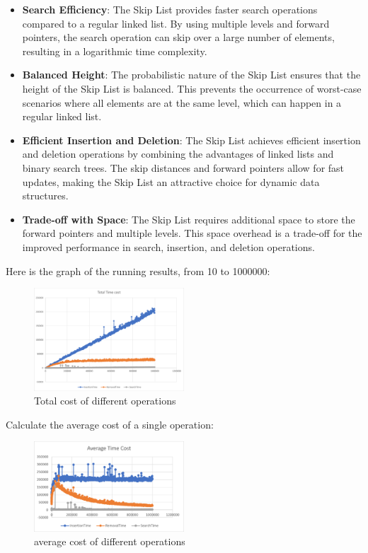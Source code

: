 \documentclass[12pt]{article}
\begin{document}
\begin{itemize}
  \item \textbf{Search Efficiency}: The Skip List provides faster search operations compared to a regular linked list. By using multiple levels and forward pointers, the search operation can skip over a large number of elements, resulting in a logarithmic time complexity.

  \item \textbf{Balanced Height}: The probabilistic nature of the Skip List ensures that the height of the Skip List is balanced. This prevents the occurrence of worst-case scenarios where all elements are at the same level, which can happen in a regular linked list.

  \item \textbf{Efficient Insertion and Deletion}: The Skip List achieves efficient insertion and deletion operations by combining the advantages of linked lists and binary search trees. The skip distances and forward pointers allow for fast updates, making the Skip List an attractive choice for dynamic data structures.

  \item \textbf{Trade-off with Space}: The Skip List requires additional space to store the forward pointers and multiple levels. This space overhead is a trade-off for the improved performance in search, insertion, and deletion operations.

\end{itemize}
Here is the graph of the running results, from 10 to 1000000:
\begin{figure}[htbp]
  \centering
  \includegraphics[width=0.5\textwidth]{pic0.png}
  \caption{Total cost of different operations}
  \label{average cost of different operations}
\end{figure}
Calculate the average cost of a single operation:
\begin{figure}[htbp]
  \centering
  \includegraphics[width=0.5\textwidth]{pic1.png}
  \caption{average cost of different operations}
  \label{average cost of different operations}
\end{figure}
\end{document}
